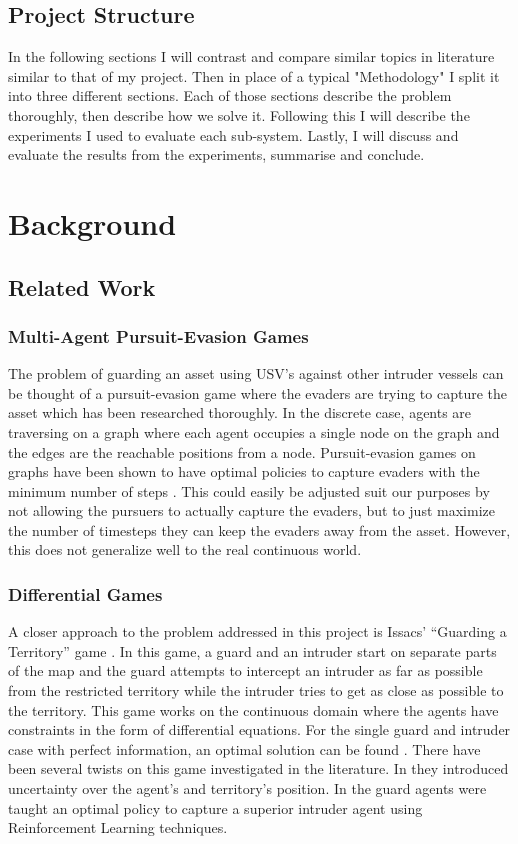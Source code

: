 \documentclass[bsc,frontabs,twoside,singlespacing,parskip,deptreport]{infthesis}     %
\begin{document}
\section{Project Structure}
In the following sections I will contrast and compare similar topics in literature similar to that of my project. Then in place of a typical "Methodology" I split it into three different sections. Each of those sections describe the problem thoroughly, then describe how we solve it. Following this I will describe the experiments I used to evaluate each sub-system. Lastly, I will discuss and evaluate the results from the experiments, summarise and conclude.

\chapter{Background}
\label{chap:background}
\section{Related Work}

\subsection{Multi-Agent Pursuit-Evasion Games}
The problem of guarding an asset using USV’s against other intruder vessels can be thought of a pursuit-evasion game where the evaders are trying to capture the asset which has been researched thoroughly. In the discrete case, agents are traversing on a graph where each agent occupies a single node on the graph and the edges are the reachable positions from a node. Pursuit-evasion games on graphs have been shown to have optimal policies to capture evaders with the minimum number of steps \cite{vieira2008optimal}. This could easily be adjusted suit our purposes by not allowing the pursuers to actually capture the evaders, but to just maximize the number of timesteps they can keep the evaders away from the asset. However, this does not generalize well to the real continuous world.

\subsection{Differential Games}
A closer approach to the problem addressed in this project is Issacs’ “Guarding a Territory” game \cite{isaacs1999differential}. In this game, a guard and an intruder start on separate parts of the map and the guard attempts to intercept an intruder as far as possible from the restricted territory while the intruder tries to get as close as possible to the territory. This game works on the continuous domain where the agents have constraints in the form of differential equations. For the single guard and intruder case with perfect information, an optimal solution can be found \cite{isaacs1999differential}. There have been several twists on this game investigated in the literature. In \cite{meng1999fuzzy} they introduced uncertainty over the agent’s and territory’s position. In \cite{raslan2016learning} the guard agents were taught an optimal policy to capture a superior intruder agent using Reinforcement Learning techniques.
\end{document}
